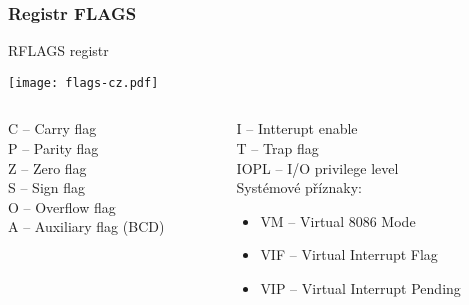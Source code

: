 \documentclass{beamer}
\begin{document}
\begin{frame}
\frametitle{Registr FLAGS}
RFLAGS registr
\begin{center}
\texttt{[image: flags-cz.pdf]}
\end{center}
\begin{columns}[t,onlytextwidth]
\begin{column}{0.5\textwidth}
C -- Carry flag\\
P -- Parity flag\\
Z -- Zero flag\\
S -- Sign flag\\
O -- Overflow flag\\
A -- Auxiliary flag (BCD)
\end{column}
\begin{column}{0.5\textwidth}  
I -- Intterupt enable\\
T -- Trap flag\\
IOPL -- I/O privilege level\\
Systémové příznaky:
\begin{itemize}
\item VM -- Virtual 8086 Mode
\item VIF -- Virtual Interrupt Flag
\item VIP -- Virtual Interrupt Pending
\end{itemize}
\end{column}
\end{columns}
\end{frame}
\end{document}
